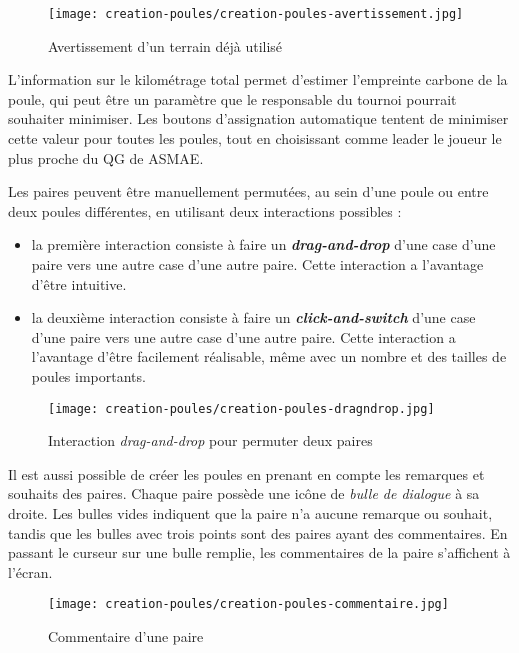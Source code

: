 \begin{figure}[H]
\centering
\texttt{[image: creation-poules/creation-poules-avertissement.jpg]}
\caption{Avertissement d'un terrain déjà utilisé}
\end{figure}

L'information sur le kilométrage total permet d'estimer l'empreinte carbone de la poule, qui peut être un paramètre que le responsable du tournoi pourrait souhaiter minimiser. Les boutons d'assignation automatique tentent de minimiser cette valeur pour toutes les poules, tout en choisissant comme leader le joueur le plus proche du QG de ASMAE.\newline

Les paires peuvent être manuellement permutées, au sein d'une poule ou entre deux poules différentes, en utilisant deux interactions possibles :

\begin{itemize}
\item la première interaction consiste à faire un \textbf{\textit{drag-and-drop}} d'une case d'une paire vers une autre case d'une autre paire. Cette interaction a l'avantage d'être intuitive.
\item la deuxième interaction consiste à faire un \textbf{\textit{click-and-switch}} d'une case d'une paire vers une autre case d'une autre paire. Cette interaction a l'avantage d'être facilement réalisable, même avec un nombre et des tailles de poules importants.
\end{itemize}

\begin{figure}[H]
\centering
\texttt{[image: creation-poules/creation-poules-dragndrop.jpg]}
\caption{Interaction \textit{drag-and-drop} pour permuter deux paires}
\end{figure}

Il est aussi possible de créer les poules en prenant en compte les remarques et souhaits des paires. Chaque paire possède une icône de \textit{bulle de dialogue} à sa droite. Les bulles vides indiquent que la paire n'a aucune remarque ou souhait, tandis que les bulles avec trois points sont des paires ayant des commentaires. En passant le curseur sur une bulle remplie, les commentaires de la paire s'affichent à l'écran.

\begin{figure}[H]
\centering
\texttt{[image: creation-poules/creation-poules-commentaire.jpg]}
\caption{Commentaire d'une paire}
\end{figure}

